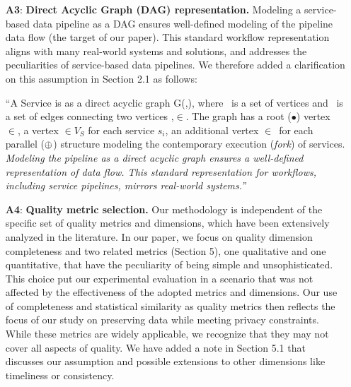 {\begin{enumerate}
        \item[\textbf{A3}:] \textbf{Direct Acyclic Graph (DAG) representation.} Modeling a service-based data pipeline as a DAG ensures well-defined modeling of the pipeline data flow (the target of our paper). This standard workflow representation aligns with many real-world systems and solutions, and addresses the peculiarities of service-based  data pipelines. We therefore added a clarification on this assumption in Section 2.1 as follows:
              
              \vspace{0.5em}
              
              \begin{adjustwidth}{10pt}{10pt}
                ``A Service \pipeline is as a direct acyclic graph G(\V,\E), where \V\ is a set of vertices and \E\ is a set of edges connecting two vertices ,$\in$\V.
            The graph has a root ($\bullet$) vertex $\in$\V, a vertex $\in$$V_S$ for each service $s_i$, an additional vertex $\in$\V\ for each parallel ($\oplus$) structure modeling the contemporary execution (\emph{fork}) of services.
                  \em{\color{OurColor}Modeling the pipeline as a direct acyclic graph ensures a well-defined representation of data flow. This standard representation for workflows, including service pipelines, mirrors real-world systems.}''
                  \vspace{0.5em}
              \end{adjustwidth}
              
        \item[\textbf{A4}:] \textbf{Quality metric selection.} Our methodology is independent of the specific set of quality metrics and dimensions, which have been extensively analyzed in the literature. In our paper, we focus on quality dimension completeness and two related metrics (Section 5), one qualitative and one quantitative, that have the peculiarity of being simple and unsophisticated. This choice put our experimental evaluation in a scenario that was not affected by the effectiveness of the adopted metrics and dimensions. Our use of completeness and statistical similarity as quality metrics then reflects the focus of our study on preserving data while meeting privacy constraints. While these metrics are widely applicable, we recognize that they may not cover all aspects of quality. We have added a note in Section 5.1 that discusses our assumption and possible extensions to other dimensions like timeliness or consistency.
              \vspace{0.5em}
        

\end{enumerate}}
